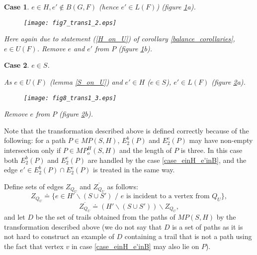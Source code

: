 \documentclass[a4paper, 12pt]{article}
\newtheorem{case}{Case}
\begin{document}
\begin{case} \label{case_einH_e'notinB}
$e \in H, e' \notin B(G,F)$ (hence $e' \in L(F)$) (figure
\ref{fig_trans1_2}a).

\begin{figure}[h]
\begin{center}
\texttt{[image: fig7\_trans1\_2.eps]}\\
\caption{}\label{fig_trans1_2}
\end{center}
\end{figure}

Here again due to statement (\ref{H_on_U}) of corollary
\ref{balance_corollaries}, $e \in U(F)$. Remove $e$ and $e'$ from
$P$ (figure \ref{fig_trans1_2}b).
\end{case}

\begin{case} \label{case_einS}
$e \in S$.

As $e \in U(F)$ (lemma \ref{S_on_U}) and $e' \in H$ ($e \in S$), $e'
\in L(F)$ (figure \ref{fig_trans1_3}a).

\begin{figure}[h]
\begin{center}
\texttt{[image: fig8\_trans1\_3.eps]}\\
\caption{}\label{fig_trans1_3}
\end{center}
\end{figure}

Remove $e$ from $P$ (figure \ref{fig_trans1_3}b).
\end{case}

Note that the transformation described above is defined correctly
because of the following: for a path $P \in MP(S,H)$, $E_2^b(P)$ and
$E_2^e(P)$ may have non-empty intersection only if $P \in
MP_o^H(S,H)$ and the length of $P$ is three. In this case both
$E_2^b(P)$ and $E_2^e(P)$ are handled by the case
\ref{case_einH_e'inB}, and the edge $e' \in E_2^b(P) \cap E_2^e(P)$
is treated in the same way.

Define sets of edges $Z_{Q_U}$ and $\overline{Z_{Q_U}}$ as follows:
$$Z_{Q_U} \doteq \{ e \in H' \backslash (S \cup S') \text{ / $e$ is incident to a vertex from $Q_U$} \},$$
$$\overline{Z_{Q_U}} \doteq (H' \backslash (S \cup S')) \backslash Z_{Q_U},$$
and let $D$ be the set of trails obtained from the paths of
$MP(S,H)$ by the transformation described above (we do not say that
$D$ is a set of paths as it is not hard to construct an example of
$D$ containing a trail that is not a path using the fact that vertex
$v$ in case \ref{case_einH_e'inB} may also lie on $P$).
\end{document}
